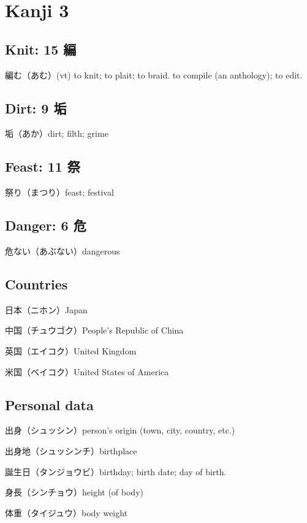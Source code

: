\chapter{Kanji 3}

\section{Knit: 15 編}

編む（あむ）(vt)
to knit; to plait; to braid.
to compile (an anthology); to edit.

\section{Dirt: 9 垢}

垢（あか）dirt; filth; grime

\section{Feast: 11 祭}

祭り（まつり）feast; festival

\section{Danger: 6 危}

危ない（あぶない）dangerous

\section{Countries}

日本（ニホン）Japan

中国（チュウゴク）People's Republic of China

英国（エイコク）United Kingdom

米国（ベイコク）United States of America

\section{Personal data}

出身（シュッシン）person's origin (town, city, country, etc.)

出身地（シュッシンチ）birthplace

誕生日（タンジョウビ）birthday; birth date; day of birth.

身長（シンチョウ）height (of body)

体重（タイジュウ）body weight

